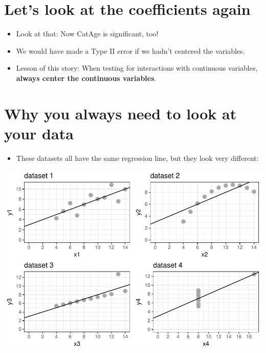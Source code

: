 \documentclass[]{article}
\providecommand{\tightlist}{%
  \setlength{\itemsep}{0pt}\setlength{\parskip}{0pt}}
\begin{document}
\section{Let's look at the coefficients
again}\label{lets-look-at-the-coefficients-again}

\begin{table}[H]
\centering
{}
\end{table}

\begin{itemize}
\tightlist
\item
  Look at that: Now CatAge is significant, too!
\item
  We would have made a Type II error if we hadn't centered the
  variables.
\item
  Lesson of this story: When testing for interactions with continuous
  variables, \textbf{always center the continuous variables}.
\end{itemize}

\section{Why you always need to look at your
data}\label{why-you-always-need-to-look-at-your-data}

\begin{itemize}
\tightlist
\item
  These datasets all have the same regression line, but they look very
  different:
\end{itemize}

\includegraphics{Basics_of_Regression_files/figure-latex/unnamed-chunk-15-1.pdf}
\end{document}
